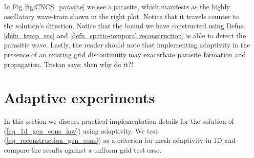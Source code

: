 \documentclass[final]{amsart}
\newcommand{\tristan}[1]{{\color{purple} Tristan says:  #1 }}
\numberwithin{equation}{section}
\begin{document}
			

In Fig.\ref{fig:CNCS_parasite} we see a parasite, which manifests as the highly oscillatory wave-train shown in the right plot.  Notice that it travels counter to the solution's direction. Notice that the bound we have constructed using  Defns. \ref{defn_temp_rec} and \ref{defn_spatio-temporal reconstruction} is able to detect the parasitic wave.  Lastly, the reader should note that implementing adaptivity in the presence of an existing grid discontinuity may exacerbate parasite formation and propagation.  \tristan{then why do it?!}


\section{Adaptive experiments}\label{sec:adaptive_implementation}
In  this section we discuss practical implementation details for the solution of (\ref{eq_1d_gen_cons_law}) using adaptivity.   We test (\ref{eq_reconstruction_gen_cons}) as a criterion for mesh adaptivity in 1D and  compare the results against a uniform grid test case. 
\end{document}
